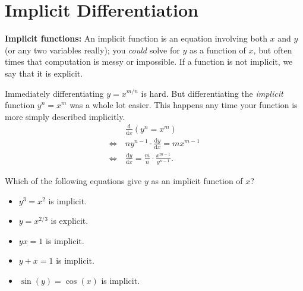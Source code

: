 \section{Implicit Differentiation}
\begin{note}\textbf{Implicit functions:} An implicit function is an equation involving both \(x\) and \(y\) (or any two variables really); you \textit{could} solve for \(y\) as a function of \(x\), but often times that computation is messy or impossible. If a function is not implicit, we say that it is explicit.
\end{note}

Immediately differentiating \(y=x^{m/n}\) is hard. But differentiating the \textit{implicit} function \(y^n=x^m\) was a whole lot easier. This happens any time your function is more simply described implicitly.
\begin{align*}
    \phantom{\Leftrightarrow\,} & \frac{\mathrm{d}}{\mathrm{d}x}(y^n=x^m)\\
                             \Leftrightarrow\, & ny^{n-1}\cdot\frac{\mathrm{d}y}{\mathrm{d}x}=mx^{m-1}\\
                             \Leftrightarrow\, & \frac{\mathrm{d}y}{\mathrm{d}x}=\frac{m}{n}\cdot\frac{x^{m-1}}{y^{n-1}}.
\end{align*}

\begin{eg}
    Which of the following equations give \(y\) as an implicit function of \(x\)?
    \begin{itemize}
        \item \(y^3=x^2\) is implicit. 
        \item \(y=x^{2/3}\) is explicit.
        \item \(yx=1\) is implicit.
        \item \(y+x=1\) is implicit.
        \item \(\sin(y)=\cos(x)\) is implicit.
    \end{itemize}
\end{eg}

